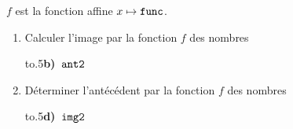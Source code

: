 \documentclass[exercice]{thedocument}%
\begin{document}
%
$f$ est la fonction affine $x\mapsto\<func;$.
\begin{enumerate}
    \item Calculer l'image par la fonction $f$ des nombres\par\medskip
    \hbox{\hskip20pt\hbox to.5\hbox{\bfseries b) $\<ant2;$\hfill}}\par\medskip
    \item Déterminer l'antécédent par la fonction $f$ des nombres\par\medskip
    \hbox{\hskip20pt\hbox to.5\hbox{\bfseries d) $\<img2;$\hfill}}
\end{enumerate}
\end{document}
